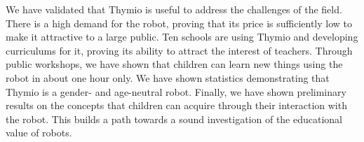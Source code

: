 \documentclass[letterpaper, 10 pt, conference]{ieeeconf}  %
\begin{document}
% 
We have validated that Thymio is useful to address the challenges of the field.
There is a high demand for the robot, proving that its price is sufficiently low to make it attractive to a large public.
Ten schools are using Thymio and developing curriculums for it, proving its ability to attract the interest of teachers.
Through public workshops, we have shown that children can learn new things using the robot in about one hour only.
We have shown statistics demonstrating that Thymio is a gender- and age-neutral robot.
Finally, we have shown preliminary results on the concepts that children can acquire through their interaction with the robot.
This builds a path towards a sound investigation of the educational value of robots.











%
%
%



\end{document}
